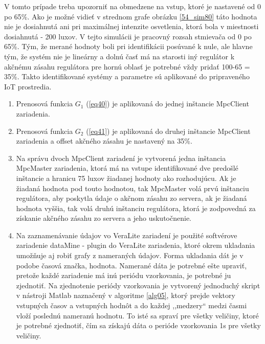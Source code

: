 V tomto prípade treba upozorniť na obmedzene na vstup, ktoré je nastavené od 0 po 65\%. Ako je možné vidieť v strednom grafe obrázku \ref{54_sim80} táto hodnota nie je dosiahnutá ani pri maximálnej intenzite osvetlenia, ktorá bola v miestnosti dosiahnutá - 200 luxov. V tejto simulácii je pracovný rozsah stmievača od 0 po 65\%. Tým, že merané hodnoty boli pri identifikácii posúvané k nule, ale hlavne tým, že systém nie je lineárny a dolnú časť má na starosti iný regulátor k akčnému zásahu regulátora pre hornú oblasť je potrebné vždy pridať 100-65 = 35\%.
Takto identifikované systémy a parametre sú aplikované do pripraveného IoT prostredia. 
\begin{enumerate}
\item Prenosová funkcia $G_1$ (\ref{eq40}) je aplikovaná do jednej inštancie MpcClient zariadenia. 
\item Prenosová funkcia $G_2$ (\ref{eq41}) je aplikovaná do druhej inštancie MpcClient zariadenia a offset akčného zásahu je nastavený na 35\%.
\item Na správu dvoch MpcClient zariadení je vytvorená jedna inštancia MpcMaster zariadenia, ktorá má na vstupe identifikované dve predošlé inštancie a hranicu 75 luxov žiadanej hodnoty ako rozhodujúcu. Ak je žiadaná hodnota pod touto hodnotou, tak MpcMaster volá prvú inštanciu regulátora, aby poskytla údaje o akčnom zásahu zo servera, ak je žiadaná hodnota vyššia, tak volá druhú inštanciu regulátora, ktorá je zodpovedná za získanie akčného zásahu zo servera a jeho uskutočnenie. 
\item Na zaznamenávanie údajov vo VeraLite zariadení je použité softvérove zariadenie dataMine \cite{IOT31} - plugin do VeraLite zariadenia, ktoré okrem ukladania umožňuje aj robiť grafy z nameraných údajov. Forma ukladania dát je v podobe časová značka, hodnota. Namerané dáta je potrebné ešte upraviť, pretože každé zariadenie má inú periódu vzorkovania, je potrebné ju zjednotiť. Na zjednotenie periódy vzorkovania je vytvorený jednoduchý skript v nástroji Matlab naznačený v algoritme  \ref{alg05}, ktorý prejde vektory vstupných časov a vstupných hodnôt a do každej ,,medzery`` medzi časmi vloží poslednú nameranú hodnotu. To isté sa spraví pre všetky veličiny, ktoré je potrebné zjednotiť, čím sa získajú dáta o perióde vzorkovania 1s pre všetky veličiny.
\end{enumerate}

